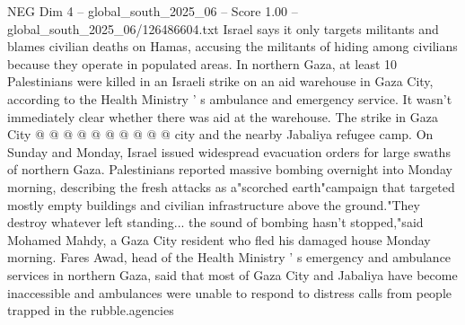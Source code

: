 \begin{textsample}{NEG Dim 4 – global\_south\_2025\_06 – Score 1.00 – global\_south\_2025\_06/126486604.txt}
Israel says it only targets militants and blames civilian deaths on Hamas, accusing the militants of hiding among civilians because they operate in populated areas.
In northern Gaza, at least 10 Palestinians were killed in an Israeli strike on an aid warehouse in Gaza City, according to the Health Ministry ' s ambulance and emergency service.
It wasn't immediately clear whether there was aid at the warehouse.
The strike in Gaza City @ @ @ @ @ @ @ @ @ @ city and the nearby Jabaliya refugee camp.
On Sunday and Monday, Israel issued widespread evacuation orders for large swaths of northern Gaza.
Palestinians reported massive bombing overnight into Monday morning, describing the fresh attacks as a"scorched earth"campaign that targeted mostly empty buildings and civilian infrastructure above the ground."They destroy whatever left standing... the sound of bombing hasn't stopped,"said Mohamed Mahdy, a Gaza City resident who fled his damaged house Monday morning.
Fares Awad, head of the Health Ministry ' s emergency and ambulance services in northern Gaza, said that most of Gaza City and Jabaliya have become inaccessible and ambulances were unable to respond to distress calls from people trapped in the rubble.agencies

\end{textsample}
